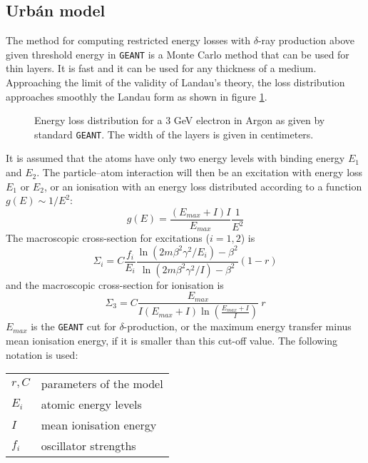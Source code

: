 \subsection{Urb\'an model}
\label{urban}
The method for computing restricted energy losses
with $\delta$-ray production above given threshold energy in 
{\tt GEANT} is
a Monte Carlo method that can be used
for thin layers.
It is fast and it can be used for any thickness of a medium.
Approaching the limit of the validity of Landau's theory, the loss
distribution approaches smoothly the Landau form as shown in
figure \ref{fg:phys332-2}.
\begin{figure}[hbt]
   \centering
   \caption{Energy loss distribution for a 3 GeV electron in
            Argon as given by standard {\tt GEANT}.
            The width of the layers is given in centimeters.}
    \label{fg:phys332-2}
\end{figure}

It is assumed that the atoms have only two energy levels
with binding energy $E_1$ and $E_2$.
The particle--atom interaction will then be an excitation
with energy loss $E_1$ or $E_2$, or an ionisation
with an energy loss distributed according to a function
$g(E) \sim 1/E^2$:
\begin{equation}
g(E) = \frac{ (E_{max} + I)I}{E_{max}} \frac{1}{E^2}
\end{equation}
The macroscopic cross-section for excitations ($i=1,2$) is
\begin{equation}
\label{eq:sigex}
\Sigma_i = C \frac{f_i}{E_i} \frac{ \ln (2 m \beta^2 \gamma^2/E_i) - \beta^2}
             {\ln (2 m \beta^2 \gamma^2/ I) - \beta^2}(1-r)
\end{equation}
and the macroscopic cross-section for ionisation is
\begin{equation}
\label{eq:sigion}
\Sigma_3 = C \frac{E_{max}}{I(E_{max}+I) \ln(\frac{E_{max}+I}{I})}
           ~ r
\end{equation}
    $E_{max}$ is the {\tt GEANT} cut for $\delta$-production,
    or the maximum energy transfer minus mean
    ionisation energy, if it is smaller than this
    cut-off value.
The following notation is used:

\begin{tabular}{ll}
$r, C$          & parameters of the model \\
$E_i$           & atomic energy levels \\
$I$             & mean ionisation energy \\
${f_i}$         & oscillator strengths \\
\end{tabular}

